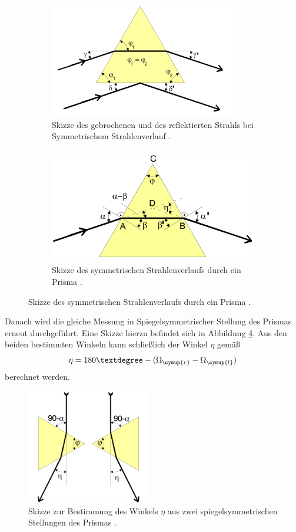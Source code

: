 \begin{figure}[H]
  \centering
  \begin{subfigure}{0.48\textwidth}
    \includegraphics[height=5cm]{data/eta1.png}
    \caption{Skizze des gebrochenen und des reflektierten Strahls bei Symmetrischem
    Strahlenverlauf \cite{Versuchsanleitung}.}
    \label{fig:eta1}
  \end{subfigure}
  \begin{subfigure}{0.48\textwidth}
    \includegraphics[height=5cm]{data/symmetrisch.png}
    \caption{Skizze des symmetrischen Strahlenverlaufs durch ein Prisma \cite{Versuchsanleitung}.}
    \label{fig:symmetrisch}
  \end{subfigure}
\end{figure}

Danach wird die gleiche Messung in Spiegelsymmetrischer Stellung des Prismas erneut
durchgeführt. Eine Skizze hierzu befindet sich in Abbildung \ref{fig:eta2}.
Aus den beiden bestimmten Winkeln kann schließlich der Winkel $\eta$ gemäß
\begin{equation}
  \eta=180°-(\Omega_{\symup{r}}-\Omega_{\symup{l}})
  \label{eqn:eta}
\end{equation}
berechnet werden.

\begin{figure}[H]
  \centering
  \includegraphics[height=5cm]{data/eta2.png}
  \caption{Skizze zur Bestimmung des Winkels $\eta$ aus zwei spiegelsymmetrischen Stellungen
  des Prismas \cite{Versuchsanleitung}.}
  \label{fig:eta2}
\end{figure}

